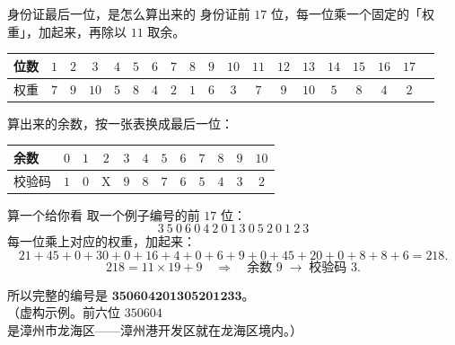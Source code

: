 \documentclass[10pt]{beamer}
\begin{document}
\begin{frame}{身份证最后一位，是怎么算出来的}
  身份证前 \(17\) 位，每一位乘一个固定的「权重」，加起来，再除以 \(11\) 取余。
  \begin{center}
  \begin{tabular}{@{}lc*{17}{c}@{}}
    \toprule
    位数 & \(1\) & \(2\) & \(3\) & \(4\) & \(5\) & \(6\) & \(7\) & \(8\) & \(9\) & \(10\) & \(11\) & \(12\) & \(13\) & \(14\) & \(15\) & \(16\) & \(17\) \\
    \midrule
    权重 & \(7\) & \(9\) & \(10\) & \(5\) & \(8\) & \(4\) & \(2\) & \(1\) & \(6\) & \(3\) & \(7\) & \(9\) & \(10\) & \(5\) & \(8\) & \(4\) & \(2\) \\
    \bottomrule
  \end{tabular}
  \end{center}
  \pause
  算出来的余数，按一张表换成最后一位：
  \begin{center}
  \begin{tabular}{@{}l*{11}{c}@{}}
    \toprule
    余数 & \(0\) & \(1\) & \(2\) & \(3\) & \(4\) & \(5\) & \(6\) & \(7\) & \(8\) & \(9\) & \(10\) \\
    \midrule
    校验码 & \(1\) & \(0\) & X & \(9\) & \(8\) & \(7\) & \(6\) & \(5\) & \(4\) & \(3\) & \(2\) \\
    \bottomrule
  \end{tabular}
  \end{center}
\end{frame}

\begin{frame}{算一个给你看}
  取一个例子编号的前 \(17\) 位：
  \[
    3\ 5\ 0\ 6\ 0\ 4\ 2\ 0\ 1\ 3\ 0\ 5\ 2\ 0\ 1\ 2\ 3
  \]
  每一位乘上对应的权重，加起来：
  \[
    21+45+0+30+0+16+4+0+6+9+0+45+20+0+8+8+6=218 .
  \]
  \pause
  \[
    218=11\times19+9 \quad\Longrightarrow\quad \text{余数 }9 \;\longrightarrow\; \text{校验码 }3 .
  \]
  \pause
  \begin{center}
    所以完整的编号是 \quad \(\mathbf{350604201305201233}\)。\\[0.3em]
    {\small （虚构示例。前六位 \(350604\) 是漳州市龙海区——漳州港开发区就在龙海区境内。）}
  \end{center}
\end{frame}
\end{document}
